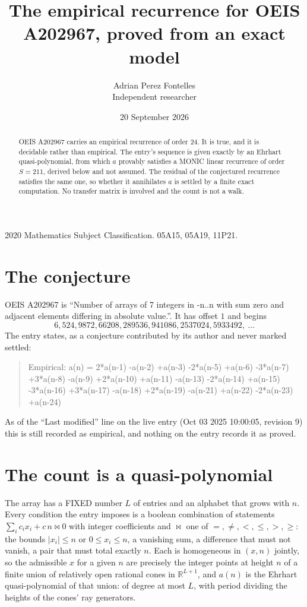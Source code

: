 \documentclass[11pt,a4paper]{article}
\title{The empirical recurrence for OEIS A202967, proved from an exact model}
\author{Adrian Perez Fontelles\\ \small Independent researcher}
\date{20 September 2026}
\theoremstyle{plain}
\theoremstyle{definition}
\begin{document}
\maketitle

\begin{abstract}
OEIS A202967 carries an empirical recurrence of order $24$. It is true, and it is
decidable rather than empirical. The entry's sequence is given exactly by an Ehrhart quasi-polynomial, from
which $a$ provably satisfies a MONIC linear recurrence of order $S=211$, derived below and not
assumed. The residual of the conjectured recurrence satisfies the same one, so whether it
annihilates $a$ is settled by a finite exact computation. No transfer matrix is involved and the count is not a walk.
\end{abstract}

\noindent\small 2020 Mathematics Subject Classification. 05A15, 05A19, 11P21.\normalsize

\section{The conjecture}

OEIS A202967 is ``Number of arrays of 7 integers in -n..n with sum zero and adjacent elements differing in absolute value.''. It has offset $1$ and begins
\[
6, 524, 9872, 66208, 289536, 941086, 2537024, 5933492,\ \dots
\]
The entry states, as a conjecture contributed by its author and never marked settled:
\begin{quote}
Empirical: a(n) = 2*a(n-1) -a(n-2) +a(n-3) -2*a(n-5) +a(n-6) -3*a(n-7) +3*a(n-8) -a(n-9) +2*a(n-10) +a(n-11) -a(n-13) -2*a(n-14) +a(n-15) -3*a(n-16) +3*a(n-17) -a(n-18) +2*a(n-19) -a(n-21) +a(n-22) -2*a(n-23) +a(n-24)
\end{quote}
As of the ``Last modified'' line on the live entry (Oct 03 2025 10:00:05, revision 9)
this is still recorded as empirical, and nothing on the entry records it as proved.

\section{The count is a quasi-polynomial}

The array has a FIXED number $L$ of entries and an alphabet that grows with $n$. Every
condition the entry imposes is a boolean combination of statements
$\sum_i c_ix_i + c\,n \bowtie 0$ with integer coefficients and $\bowtie$ one of
$=,\ne,<,\le,>,\ge$: the bounds $|x_i|\le n$ or $0\le x_i\le n$, a vanishing sum, a difference
that must not vanish, a pair that must total exactly $n$. Each is homogeneous in $(x,n)$
jointly, so the admissible $x$ for a given $n$ are precisely the integer points at height $n$
of a finite union of relatively open rational cones in $\mathbb{R}^{L+1}$, and $a(n)$ is
the Ehrhart quasi-polynomial of that union: of degree at most $L$, with period dividing the
heights of the cones' ray generators.
\end{document}
